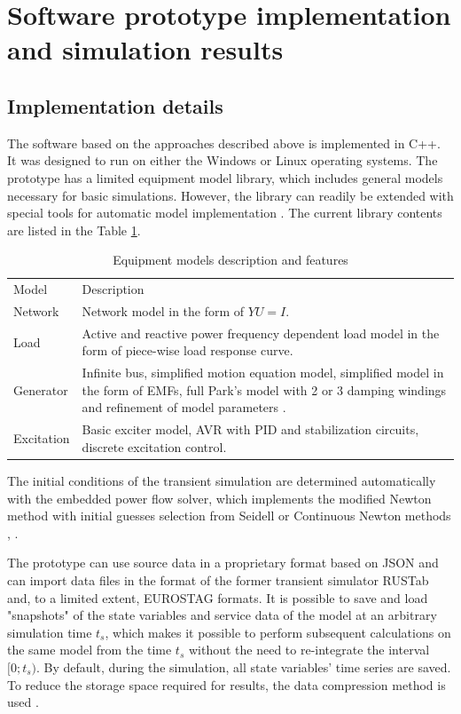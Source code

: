 \documentclass[lettersize,journal]{IEEEtran}
\begin{document}
\section {Software prototype implementation and simulation results}
\subsection {Implementation details}

The software based on the approaches described above is implemented in C++. It was designed to run on either the Windows or Linux operating systems. The prototype has a limited equipment model library, which includes general models necessary for basic simulations. However, the library can readily be extended with special tools for automatic model implementation \cite{mycompiler}. The current library contents are listed in the Table \ref{tab:models}.

\begin{table}[!h]
	\caption{Equipment models description and features \label{tab:models}}
	\centering
	\begin{tabularx}{\columnwidth}{|l|X|}
		\hline
		Model & Description \\
		\hlineB{3}	
		Network & Network model in the form of \(YU=I\).  \\
		\hline
		Load & Active and reactive power frequency dependent load model in the form of piece-wise load response curve.\\
		\hline
		Generator & Infinite bus, simplified motion equation model, simplified model in the form of EMFs, full Park's model with 2 or 3 damping windings and refinement of model parameters \cite{Canay93}. \\
		\hline
		Excitation & Basic exciter model, AVR with PID and stabilization circuits, discrete excitation control.\\
		\hline
	\end{tabularx}
\end{table}

The initial conditions of the transient simulation are determined automatically with the embedded power flow solver, which implements the modified Newton method with initial guesses selection from Seidell or Continuous Newton methods \cite{MilanoRK09}, \cite{TostadoVliz2021}.

The prototype can use source data in a proprietary format based on JSON and can import data files in the format of the former transient simulator RUSTab and, to a limited extent, EUROSTAG formats. It is possible to save and load "snapshots" of the state variables and service data of the model at an arbitrary simulation time \(t_s\), which makes it possible to perform subsequent calculations on the same model from the time \(t_s\) without the need to re-integrate the interval \([0;t_s)\). By default, during the simulation, all state variables' time series are saved. To reduce the storage space required for results, the data compression method is used \cite{mycompression}.
\end{document}
